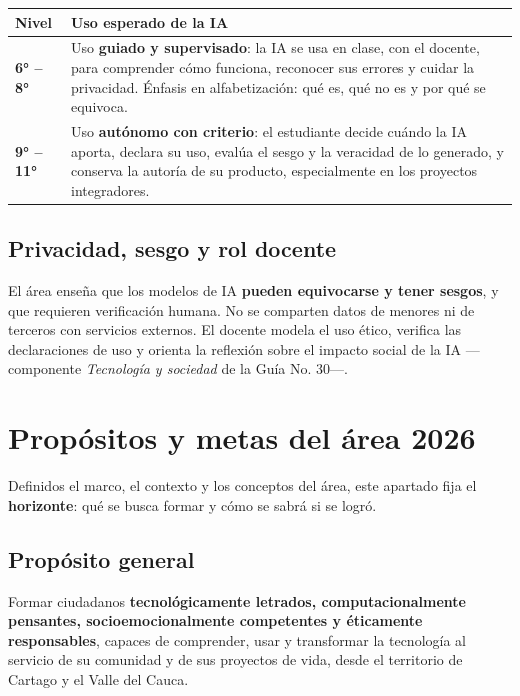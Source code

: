 \documentclass[12pt, a4paper]{article}
\begin{document}
\begin{center}
\begin{tabular}{|L{3cm}|L{11cm}|}
\hline
{}
\color{white}\textbf{Nivel} & \color{white}\textbf{Uso esperado de la IA} \\
\hline
\textbf{6° -- 8°} &
Uso \textbf{guiado y supervisado}: la IA se usa en clase, con el docente, para
comprender cómo funciona, reconocer sus errores y cuidar la privacidad. Énfasis
en alfabetización: qué es, qué no es y por qué se equivoca. \\
\hline
\textbf{9° -- 11°} &
Uso \textbf{autónomo con criterio}: el estudiante decide cuándo la IA aporta,
declara su uso, evalúa el sesgo y la veracidad de lo generado, y conserva la
autoría de su producto, especialmente en los proyectos integradores. \\
\hline
\end{tabular}
\end{center}

\subsection{Privacidad, sesgo y rol docente}

El área enseña que los modelos de IA \textbf{pueden equivocarse y tener sesgos}, y
que requieren verificación humana. No se comparten datos de menores ni de terceros
con servicios externos. El docente modela el uso ético, verifica las
declaraciones de uso y orienta la reflexión sobre el impacto social de la IA
—componente \textit{Tecnología y sociedad} de la Guía No. 30—.

\section{Propósitos y metas del área 2026}

\noindent Definidos el marco, el contexto y los conceptos del área, este apartado
fija el \textbf{horizonte}: qué se busca formar y cómo se sabrá si se logró.

\subsection{Propósito general}

Formar ciudadanos \textbf{tecnológicamente letrados, computacionalmente
pensantes, socioemocional\-mente competentes y éticamente responsables},
capaces de comprender, usar y transformar la tecnología al servicio de
su comunidad y de sus proyectos de vida, desde el territorio de Cartago
y el Valle del Cauca.
\end{document}
